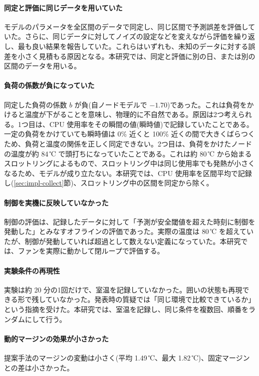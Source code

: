 \paragraph{同定と評価に同じデータを用いていた}
モデルのパラメータを全区間のデータで同定し、同じ区間で予測誤差を評価していた。さらに、同じデータに対してノイズの設定などを変えながら評価を繰り返し、最も良い結果を報告していた。これらはいずれも、未知のデータに対する誤差を小さく見積もる原因となる。本研究では、同定と評価に別の日、または別の区間のデータを用いる。

\paragraph{負荷の係数が負になっていた}
同定した負荷の係数 $b$ が負(自ノードモデルで $-1.70$)であった。これは負荷をかけると温度が下がることを意味し、物理的に不自然である。原因は2つ考えられる。1つ目は、CPU 使用率をその瞬間の値(瞬時値)で記録していたことである。一定の負荷をかけていても瞬時値は 0\% 近くと 100\% 近くの間で大きくばらつくため、負荷と温度の関係を正しく同定できない。2つ目は、負荷をかけたノードの温度が約 84\,℃ で頭打ちになっていたことである。これは約 80\,℃ から始まるスロットリングによるもので、スロットリング中は同じ使用率でも発熱が小さくなるため、モデルが成り立たない。本研究では、CPU 使用率を区間平均で記録し(\ref{sec:impl-collect}節)、スロットリング中の区間を同定から除く。

\paragraph{制御を実機に反映していなかった}
制御の評価は、記録したデータに対して「予測が安全閾値を超えた時刻に制御を発動した」とみなすオフラインの評価であった。実際の温度は 80\,℃ を超えていたが、制御が発動していれば超過として数えない定義になっていた。本研究では、ファンを実際に動かして閉ループで評価する。

\paragraph{実験条件の再現性}
実験は約 20 分の1回だけで、室温を記録していなかった。囲いの状態も再現できる形で残していなかった。発表時の質疑では「同じ環境で比較できているか」という指摘を受けた。本研究では、室温を記録し、同じ条件を複数回、順番をランダムにして行う。

\paragraph{動的マージンの効果が小さかった}
提案手法のマージンの変動は小さく(平均 1.49\,℃、最大 1.82\,℃)、固定マージンとの差は小さかった。

